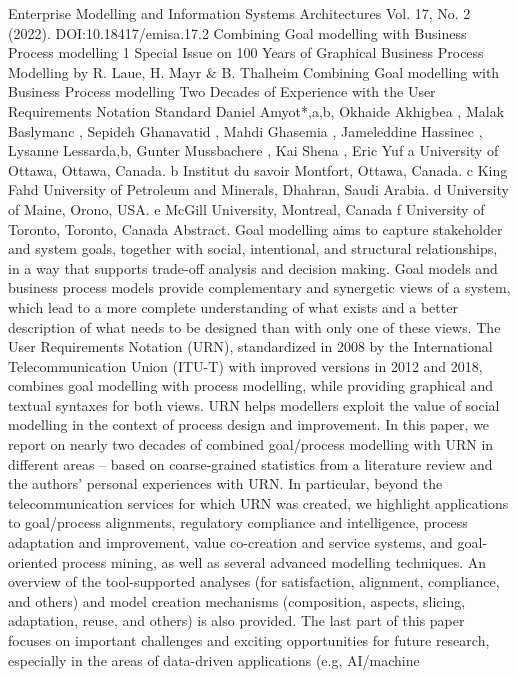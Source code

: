 Enterprise Modelling and Information Systems Architectures
Vol. 17, No. 2 (2022). DOI:10.18417/emisa.17.2
Combining Goal modelling with Business Process modelling 1
Special Issue on 100 Years of Graphical Business Process Modelling by R. Laue, H. Mayr & B. Thalheim
Combining Goal modelling with Business Process modelling
Two Decades of Experience with the User Requirements Notation
Standard
Daniel Amyot*,a,b, Okhaide Akhigbea
, Malak Baslymanc
, Sepideh Ghanavatid
,
Mahdi Ghasemia
, Jameleddine Hassinec
, Lysanne Lessarda,b, Gunter
Mussbachere
, Kai Shena
, Eric Yuf
a University of Ottawa, Ottawa, Canada.
b
Institut du savoir Montfort, Ottawa, Canada.
c King Fahd University of Petroleum and Minerals, Dhahran, Saudi Arabia.
d University of Maine, Orono, USA.
e McGill University, Montreal, Canada
f University of Toronto, Toronto, Canada
Abstract. Goal modelling aims to capture stakeholder and system goals, together with social, intentional,
and structural relationships, in a way that supports trade-off analysis and decision making. Goal models
and business process models provide complementary and synergetic views of a system, which lead to
a more complete understanding of what exists and a better description of what needs to be designed
than with only one of these views. The User Requirements Notation (URN), standardized in 2008 by the
International Telecommunication Union (ITU-T) with improved versions in 2012 and 2018, combines goal
modelling with process modelling, while providing graphical and textual syntaxes for both views. URN
helps modellers exploit the value of social modelling in the context of process design and improvement. In
this paper, we report on nearly two decades of combined goal/process modelling with URN in different
areas – based on coarse-grained statistics from a literature review and the authors’ personal experiences
with URN. In particular, beyond the telecommunication services for which URN was created, we highlight
applications to goal/process alignments, regulatory compliance and intelligence, process adaptation and
improvement, value co-creation and service systems, and goal-oriented process mining, as well as several
advanced modelling techniques. An overview of the tool-supported analyses (for satisfaction, alignment,
compliance, and others) and model creation mechanisms (composition, aspects, slicing, adaptation, reuse,
and others) is also provided. The last part of this paper focuses on important challenges and exciting
opportunities for future research, especially in the areas of data-driven applications (e.g, AI/machine
